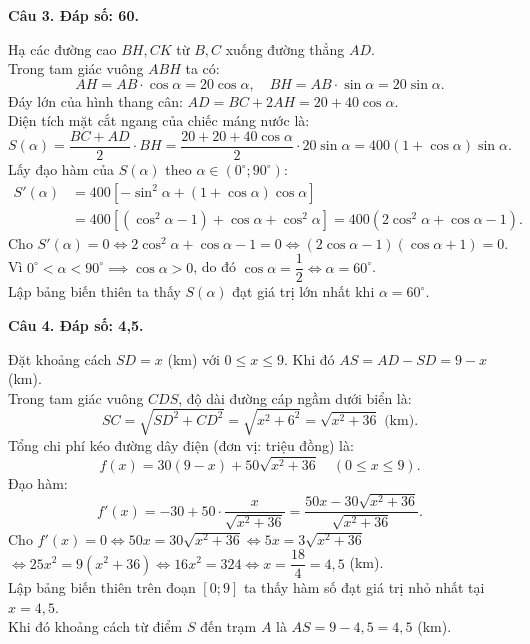 \documentclass[12pt,a4paper]{article}
\newcommand{\loigiai}[1]{\par\medskip\Needspace{4\baselineskip}\noindent\textbf{#1}\par\nobreak}
\begin{document}
\loigiai{Câu 3. Đáp số: 60.}
Hạ các đường cao $BH, CK$ từ $B, C$ xuống đường thẳng $AD$.\\
Trong tam giác vuông $ABH$ ta có:
\[AH = AB \cdot \cos \alpha = 20\cos \alpha,\quad BH = AB \cdot \sin \alpha = 20\sin \alpha.\]
Đáy lớn của hình thang cân: $AD = BC + 2AH = 20 + 40\cos \alpha$.\\
Diện tích mặt cắt ngang của chiếc máng nước là:
\[S(\alpha) = \dfrac{BC + AD}{2} \cdot BH = \dfrac{20 + 20 + 40\cos \alpha}{2} \cdot 20\sin \alpha = 400(1 + \cos \alpha)\sin \alpha.\]
Lấy đạo hàm của $S(\alpha)$ theo $\alpha \in (0^\circ; 90^\circ)$:
\begin{align*}
S'(\alpha) &= 400\left[-\sin^2 \alpha + (1 + \cos \alpha)\cos \alpha\right] \\
&= 400\left[(\cos^2 \alpha - 1) + \cos \alpha + \cos^2 \alpha\right] = 400(2\cos^2 \alpha + \cos \alpha - 1).
\end{align*}
Cho $S'(\alpha) = 0 \iff 2\cos^2 \alpha + \cos \alpha - 1 = 0 \iff (2\cos \alpha - 1)(\cos \alpha + 1) = 0$.\\
Vì $0^\circ < \alpha < 90^\circ \implies \cos \alpha > 0$, do đó $\cos \alpha = \dfrac{1}{2} \iff \alpha = 60^\circ$.\\
Lập bảng biến thiên ta thấy $S(\alpha)$ đạt giá trị lớn nhất khi $\alpha = 60^\circ$.

\loigiai{Câu 4. Đáp số: 4,5.}
Đặt khoảng cách $SD = x$ (km) với $0 \le x \le 9$. Khi đó $AS = AD - SD = 9 - x$ (km).\\
Trong tam giác vuông $CDS$, độ dài đường cáp ngầm dưới biển là:
\[SC = \sqrt{SD^2 + CD^2} = \sqrt{x^2 + 6^2} = \sqrt{x^2 + 36}\text{ (km)}.\]
Tổng chi phí kéo đường dây điện (đơn vị: triệu đồng) là:
\[f(x) = 30(9 - x) + 50\sqrt{x^2 + 36}\quad (0 \le x \le 9).\]
Đạo hàm:
\[f'(x) = -30 + 50 \cdot \dfrac{x}{\sqrt{x^2 + 36}} = \dfrac{50x - 30\sqrt{x^2 + 36}}{\sqrt{x^2 + 36}}.\]
Cho $f'(x) = 0 \iff 50x = 30\sqrt{x^2 + 36} \iff 5x = 3\sqrt{x^2 + 36}$\\
$\iff 25x^2 = 9(x^2 + 36) \iff 16x^2 = 324 \iff x = \dfrac{18}{4} = 4{,}5$ (km).\\
Lập bảng biến thiên trên đoạn $[0; 9]$ ta thấy hàm số đạt giá trị nhỏ nhất tại $x = 4{,}5$.\\
Khi đó khoảng cách từ điểm $S$ đến trạm $A$ là $AS = 9 - 4{,}5 = 4{,}5$ (km).
\end{document}
